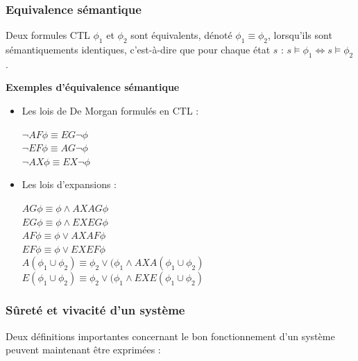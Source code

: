 \documentclass[runningheads,a4paper,10pt]{llncs}
\begin{document}
\subsubsection{Equivalence sémantique} 

Deux formules CTL $\phi_{1}$ et $\phi_{2}$ sont équivalents, dénoté $\phi_{1} \equiv \phi_{2}$, lorsqu'ils sont sémantiquements identiques, c'est-à-dire que pour chaque état $s$ : $s \vDash \phi_{1} \Leftrightarrow s \vDash \phi_{2}$.

\newpage

\textbf{Exemples d'équivalence sémantique} \\ 

\begin{itemize}
\item Les lois de De Morgan formulés en CTL : \\

\begin{center}
$\neg AF\phi \equiv EG\neg\phi$ \\
$\neg EF\phi \equiv AG\neg\phi$ \\
$\neg AX\phi \equiv EX\neg\phi$ \\
\end{center}

\item Les lois d'expansions : \\

\begin{center}
$ AG\phi \equiv \phi \wedge AXAG\phi$ \\
$ EG\phi \equiv \phi \wedge EXEG\phi$ \\
$ AF\phi \equiv \phi \vee AXAF\phi$ \\
$ EF\phi \equiv \phi \vee EXEF\phi$ \\
$ A(\phi_{1}\cup\phi_{2}) \equiv \phi_{2} \vee (\phi_{1} \wedge AXA(\phi_{1}\cup\phi_{2})$ \\
$ E(\phi_{1}\cup\phi_{2}) \equiv \phi_{2} \vee (\phi_{1} \wedge EXE(\phi_{1}\cup\phi_{2})$ \\
\end{center}

\end{itemize}


\subsubsection{Sûreté et vivacité d'un système}

Deux définitions importantes concernant le bon fonctionnement d'un système peuvent maintenant être exprimées : 
\end{document}

